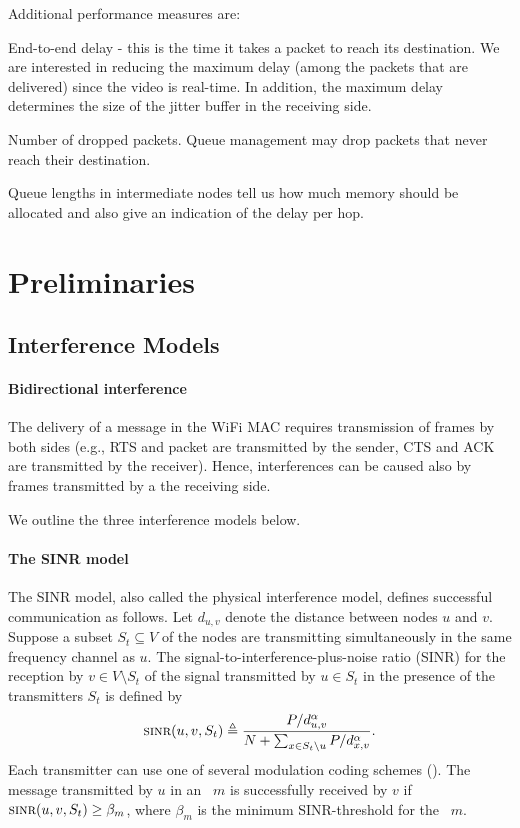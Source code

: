 \documentclass[12pt]{article}
\newenvironment{proof sketch}[1]{\noindent {\emph{Proof sketch of #1:}}}{\hfill \qed}
\newcommand{\eqdf}{\triangleq}
\newcommand{\SINR}{\text{\sc{sinr}}}
\newcommand{\MCS}{\text{\sc{mcs}}}
\begin{document}
Additional performance measures are:
\begin{inparaenum}[(i)]
\item End-to-end delay - this is the time it takes a packet to reach
  its destination. We are interested in reducing the maximum delay
  (among the packets that are delivered) since the video is real-time.
  In addition, the maximum delay determines the size of the jitter
  buffer in the receiving side.
\item Number of dropped packets. Queue management may drop packets
  that never reach their destination.
\item Queue lengths in intermediate nodes tell us how much memory
  should be allocated and also give an indication of the delay per hop.
\end{inparaenum}

\section{Preliminaries}
\label{sec:prelim}

\subsection{Interference Models}

\paragraph{Bidirectional interference}
The delivery of a message in the WiFi MAC requires transmission of
frames by both sides (e.g., RTS and packet are transmitted by the
sender, CTS and ACK are transmitted by the receiver). Hence,
interferences can be caused also by frames transmitted by a the
receiving side.

\noindent
We outline the three interference models below.
\paragraph{The SINR model}
The SINR model, also called the physical
interference model, defines successful communication as follows.  Let
$d_{u,v}$ denote the distance between nodes $u$ and $v$.  Suppose a subset
$S_t\subseteq V$ of the nodes are transmitting simultaneously in the
same frequency channel as $u$.  The signal-to-interference-plus-noise
ratio (SINR) for the reception by $v\in V\setminus S_t$ of the signal
transmitted by $u\in S_t$ in the presence of the transmitters $S_t$ is
defined by
\[
\SINR(u,v,S_t) \eqdf \frac{P/d_{u,v}^{\alpha}}{N+\sum_{x\in
    S_t\setminus{u}} P/d_{x,v}^{\alpha}}.
\]
Each transmitter can use one of several modulation coding schemes (\MCS).
The message transmitted by $u$ in an \MCS\ $m$ is successfully received by
$v$ if $\SINR(u,v,S_t)\geq \beta_m$, where $\beta_m$ is the minimum
SINR-threshold for the \MCS\ $m$.
\end{document}
